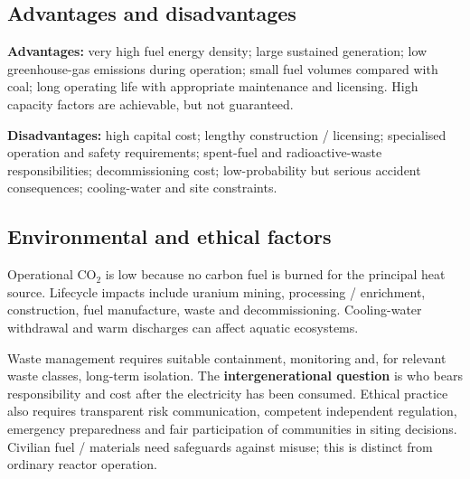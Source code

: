 \documentclass[11pt,a4paper]{article}
\begin{document}
\subsection{Advantages and disadvantages}
\textbf{Advantages:} very high fuel energy density; large sustained generation; low greenhouse-gas emissions during operation; small fuel volumes compared with coal; long operating life with appropriate maintenance and licensing. High capacity factors are achievable, but not guaranteed.

\textbf{Disadvantages:} high capital cost; lengthy construction / licensing; specialised operation and safety requirements; spent-fuel and radioactive-waste responsibilities; decommissioning cost; low-probability but serious accident consequences; cooling-water and site constraints.

\subsection{Environmental and ethical factors}
Operational CO$_2$ is low because no carbon fuel is burned for the principal heat source. Lifecycle impacts include uranium mining, processing / enrichment, construction, fuel manufacture, waste and decommissioning. Cooling-water withdrawal and warm discharges can affect aquatic ecosystems.

Waste management requires suitable containment, monitoring and, for relevant waste classes, long-term isolation. The \textbf{intergenerational question} is who bears responsibility and cost after the electricity has been consumed. Ethical practice also requires transparent risk communication, competent independent regulation, emergency preparedness and fair participation of communities in siting decisions. Civilian fuel / materials need safeguards against misuse; this is distinct from ordinary reactor operation.
\end{document}

